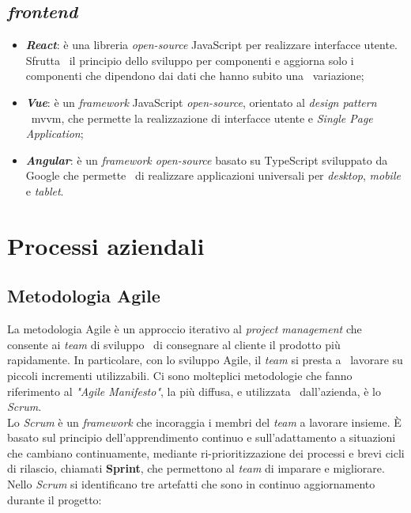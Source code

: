 \subsection{\emph{\Gls{frontend}}}

\begin{itemize}
  \item \textbf{\emph{React}}: è una libreria \emph{\gls{open-source}} JavaScript per realizzare interfacce utente. Sfrutta \
  il principio dello sviluppo per componenti e aggiorna solo i componenti che dipendono dai dati che hanno subito una \
  variazione;
  \item \textbf{\emph{Vue}}: è un \emph{framework} JavaScript \emph{open-source}, orientato al \emph{design pattern} \
  \acrshort{mvvm}, che permette la realizzazione di interfacce utente e \emph{Single Page Application};
  \item \textbf{\emph{Angular}}: è un \emph{framework open-source} basato su TypeScript sviluppato da Google che permette \
  di realizzare applicazioni universali per \emph{desktop}, \emph{mobile} e \emph{tablet}.
\end{itemize}

\section{Processi aziendali}

\subsection{Metodologia Agile}
La metodologia Agile è un approccio iterativo al \emph{project management} che consente ai \emph{team} di sviluppo \
di consegnare al cliente il prodotto più rapidamente. In particolare, con lo sviluppo Agile, il \emph{team} si presta a \
lavorare su piccoli incrementi utilizzabili. Ci sono molteplici metodologie che fanno riferimento al \emph{"Agile Manifesto"}, la più diffusa, e utilizzata \
dall'azienda, è lo \emph{Scrum}. \\

Lo \emph{Scrum} è un \emph{framework} che incoraggia i membri del \emph{team} a lavorare insieme. È basato sul principio dell'apprendimento continuo e sull'adattamento a situazioni che cambiano continuamente, mediante ri-prioritizzazione dei processi e brevi cicli di rilascio, chiamati \textbf{Sprint}, che permettono al \emph{team} di imparare e migliorare. Nello \emph{Scrum} si identificano tre artefatti che sono in continuo aggiornamento durante il progetto:

